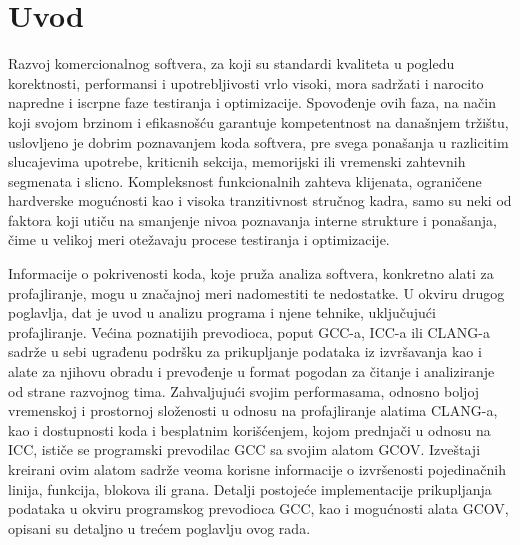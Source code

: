 \documentclass[12pt,oneside]{memoir}
\begin{document}
\frontmatter
\naslovna
\komisija
\apstrakt
\tableofcontents

\mainmatter

\chapter{Uvod}

Razvoj komercionalnog softvera, za koji su standardi kvaliteta u pogledu korektnosti, performansi i upotrebljivosti vrlo visoki, mora sadržati i narocito napredne i iscrpne faze testiranja i optimizacije. Spovođenje ovih faza, na način koji svojom brzinom i efikasnošću garantuje kompetentnost na današnjem tržištu, uslovljeno je dobrim poznavanjem koda softvera, pre svega ponašanja u razlicitim slucajevima upotrebe, kriticnih sekcija, memorijski ili vremenski zahtevnih segmenata i slicno. Kompleksnost funkcionalnih zahteva  klijenata, ograničene hardverske mogućnosti kao i visoka tranzitivnost stručnog kadra, samo su neki od faktora koji utiču na smanjenje nivoa poznavanja interne strukture i ponašanja, čime u velikoj meri otežavaju procese testiranja i optimizacije.

Informacije o pokrivenosti koda, koje pruža analiza softvera, konkretno alati za profajliranje, mogu u značajnoj meri nadomestiti te nedostatke. U okviru drugog poglavlja, dat je uvod u analizu programa i njene tehnike, uključujući profajliranje. Većina poznatijih prevodioca, poput GCC-a, ICC-a ili CLANG-a sadrže u sebi ugrađenu podršku za prikupljanje podataka iz izvršavanja kao i alate za njihovu obradu i prevođenje u format pogodan za čitanje i analiziranje od strane razvojnog tima. Zahvaljujući svojim performasama, odnosno boljoj vremenskoj i prostornoj složenosti u odnosu na profajliranje alatima CLANG-a, kao i dostupnosti koda i besplatnim korišćenjem, kojom prednjači u odnosu na ICC, ističe se programski prevodilac GCC sa svojim alatom GCOV. Izveštaji kreirani ovim alatom sadrže veoma korisne informacije o izvršenosti pojedinačnih linija, funkcija, blokova ili grana. Detalji postojeće implementacije prikupljanja podataka u okviru programskog prevodioca GCC, kao i mogućnosti alata GCOV, opisani su detaljno u trećem poglavlju ovog rada.
 
\end{document}
